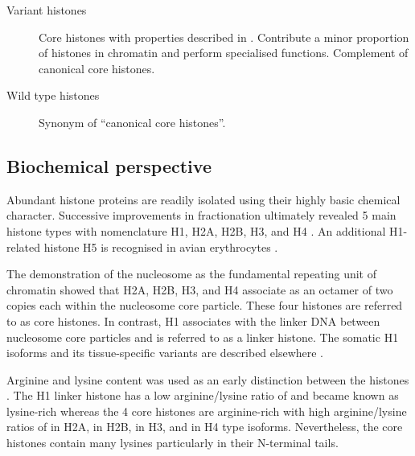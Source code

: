 {\begin{shaded}
\begin{description}
        \item[Variant histones] \hfill \newline
        Core histones with properties described in .
        Contribute a minor proportion of histones in chromatin and perform specialised functions.
        Complement of canonical core histones.

        \item[Wild type histones] \hfill \newline
        Synonym of ``canonical core histones''.
      \end{description}
    \end{shaded}
  }

  \subsection{Biochemical perspective}

    Abundant histone proteins are readily isolated using their
    highly basic chemical character.
    Successive improvements in fractionation ultimately revealed 5 main histone types
    with nomenclature H1, H2A, H2B, H3, and H4 \citep{bradbury1975-histone-nomenclature}.
    An additional H1-related histone H5 is recognised in avian erythrocytes \citep{HFive-review}.

    The demonstration of the nucleosome as the fundamental
    repeating unit of chromatin \citep{kornberg1974-model}
    showed that H2A, H2B, H3, and H4 associate as an octamer of two copies each within the
    nucleosome core particle. These four histones are referred to as core histones.
    In contrast, H1 associates with the linker DNA between nucleosome core particles
    and is referred to as a linker histone.
    The somatic H1 isoforms and its tissue-specific
    variants are described elsewhere \citep{harshman2013h1-review}.

    Arginine and lysine content was used as an early distinction between the histones \citep{ElginWeintraub1975}.
    The H1 linker histone has a low arginine/lysine ratio of
     \result{}
    and became known as lysine-rich
    whereas the 4 core histones are arginine-rich
    with high arginine/lysine ratios of
     \result{} in H2A,
     \result{} in H2B,
     \result{} in H3,
    and  \result{} in H4 type isoforms.
    Nevertheless, the core histones contain many lysines particularly in their N-terminal tails.

